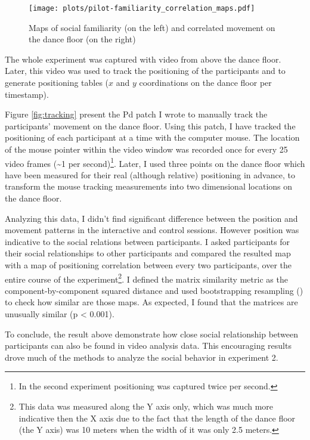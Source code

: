 \documentclass[a4paper,11pt]{article}
\begin{document}
{\begin{figure}[!htb]
    \centering
    \texttt{[image: plots/pilot-familiarity\_correlation\_maps.pdf]}
    \caption{Maps of social familiarity (on the left) and correlated movement on the dance floor (on the right)}\label{plot:pilot-familiarity_correlation_maps}
\end{figure}

The whole experiment was captured with video from above the dance floor.
Later, this video was used to track the positioning of the participants and to generate positioning tables ($x$ and $y$ coordinations on the dance floor per timestamp).

Figure \ref{fig:tracking} present the Pd patch I wrote to manually track the participants' movement on the dance floor.
Using this patch, I have tracked the positioning of each participant at a time with the computer mouse.
The location of the mouse pointer within the video window was recorded once for every 25 video frames (\textasciitilde{}1 per second)\footnote{In the second experiment positioning was captured twice per second.}.
Later, I used three points on the dance floor which have been measured for their real (although relative) positioning in advance, to transform the mouse tracking measurements into two dimensional locations on the dance floor.

Analyzing this data, I didn't find significant difference between the position and movement patterns in the interactive and control sessions.
However position was indicative to the social relations between participants.
I asked participants for their social relationships to other participants and compared the resulted map with a map of positioning correlation between every two participants, over the entire course of the experiment\footnote{This data was measured along the Y axis only, which was much more indicative then the X axis due to the fact that the length of the dance floor (the Y axis) was 10 meters when the width of it was only 2.5 meters.}.
I defined the matrix similarity metric as the component-by-component squared distance and used bootstrapping resampling (\cite{good2006permutation}) to check how similar are those maps.
As expected, I found that the matrices are unusually similar (p \textless{} 0.001).

To conclude, the result above demonstrate how close social relationship between participants can also be found in video analysis data.
This encouraging results drove much of the methods to analyze the social behavior in experiment 2.

}
\end{document}
